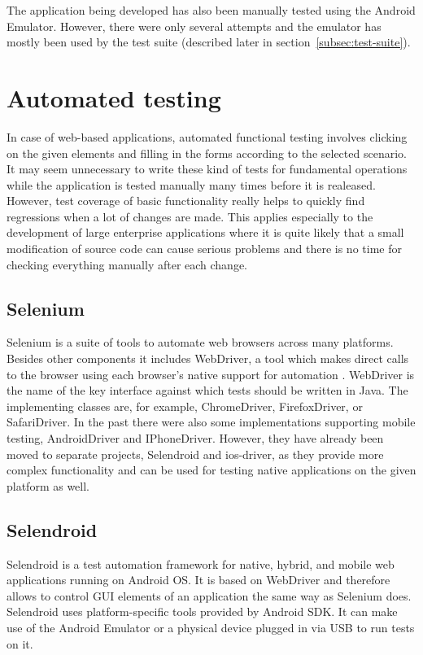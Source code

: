 \documentclass[12pt,oneside,final]{fithesis2}
\begin{document}
The application being developed has also been manually tested using the Android Emulator.
However, there were only several attempts and the emulator has mostly been used by the test suite (described later in section~\ref{subsec:test-suite}).

\section{Automated testing}
In case of web-based applications, automated functional testing involves clicking on the given elements and filling in the forms according to the selected scenario.
It may seem unnecessary to write these kind of tests for fundamental operations while the application is tested manually many times before it is realeased.
However, test coverage of basic functionality really helps to quickly find regressions when a lot of changes are made.
This applies especially to the development of large enterprise applications where it is quite likely that a small modification of source code can cause serious problems and there is no time for checking everything manually after each change.

\subsection{Selenium}
Selenium is a suite of tools to automate web browsers across many platforms.
Besides other components it includes WebDriver, a tool which makes direct calls to the browser using each browser’s native support for automation \cite{webdriver}.
WebDriver is the name of the key interface against which tests should be written in Java.
The implementing classes are, for example, ChromeDriver, FirefoxDriver, or SafariDriver.
In the past there were also some implementations supporting mobile testing, AndroidDriver and IPhoneDriver.
However, they have already been moved to separate projects, Selendroid\footnotemark{} and ios-driver\footnotemark{}, as they provide more complex functionality and can be used for testing native applications on the given platform as well.

\subsection{Selendroid}
Selendroid is a test automation framework for native, hybrid, and mobile web applications running on Android OS.
It is based on WebDriver and therefore allows to control GUI elements of an application the same way as Selenium does.
Selendroid uses platform-specific tools provided by Android SDK.
It can make use of the Android Emulator or a physical device plugged in via USB to run tests on it.
\end{document}
